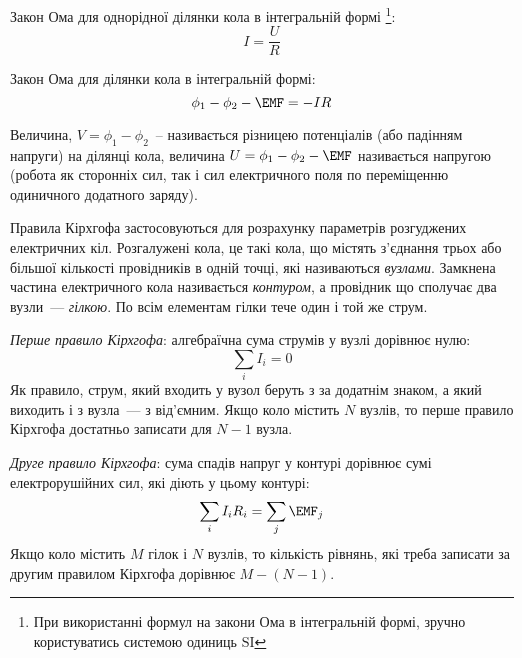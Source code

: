 \begin{Theory}
Закон Ома для однорідної ділянки кола в інтегральній формі \footnote{При використанні формул на закони Ома в інтегральній формі, зручно користуватись системою одиниць $\mathrm{SI}$}:
	\begin{equation}
		I = \frac{U}{R}		
	\end{equation}

Закон Ома для ділянки кола в інтегральній формі:
	\begin{equation}
		\phi_1 - \phi_2 - \EMF = - I R		
	\end{equation}

Величина, $V = \phi_1 - \phi_2$~-- називається різницею потенціалів (або падінням напруги) на ділянці кола, величина $U = \phi_1 - \phi_2 - \EMF$ називається напругою (робота як сторонніх сил, так і сил електричного поля по переміщенню одиничного додатного заряду).

\begin{center}
\end{center}

Правила Кірхгофа застосовуються для розрахунку параметрів розгуджених електричних кіл. Розгалужені кола, це такі кола, що містять з'єднання трьох або більшої кількості провідників в одній точці, які називаються \textit{вузлами}. Замкнена частина електричного кола називається \textit{контуром}, а провідник що сполучає два вузли~--- \textit{гілкою}. По всім елементам гілки тече один і той же струм.

\textit{Перше правило Кірхгофа}: алгебраїчна сума струмів у вузлі дорівнює нулю:
\begin{equation}
	\sum\limits_{i} I_i = 0
\end{equation}
Як правило, струм, який входить у вузол беруть з за додатнім знаком, а який виходить і з вузла~--- з від'ємним. Якщо коло містить $N$ вузлів, то перше правило Кірхгофа достатньо записати для $N - 1$ вузла.

\textit{Друге правило Кірхгофа}: сума спадів напруг у контурі дорівнює сумі електрорушійних сил, які діють у цьому контурі:
\begin{equation}
	\sum\limits_{i} I_i R_i = \sum\limits_{j}\EMF_j
\end{equation}
Якщо коло містить $M$ гілок і $N$ вузлів, то кількість рівнянь, які треба записати за другим правилом Кірхгофа  дорівнює $M - (N - 1)$.
\end{Theory}

